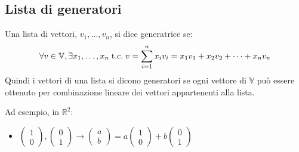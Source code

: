 \documentclass[a4paper,12pt]{article}
\begin{document}
	\subsection{Lista di generatori}
	Una lista di vettori, $v_1, \dots, v_n$, si dice generatrice se:
	\[\forall v \in \mathbb{V}, \exists x_1, \dots, x_n \;\text{t.c.}\; v = \sum_{i = 1}^{n} x_i v_i = x_1 v_1 + x_2 v_2 + \dots + x_n v_n\]
	Quindi i vettori di una lista si dicono generatori se ogni vettore di $\mathbb{V}$ può essere ottenuto per combinazione lineare dei vettori appartenenti alla lista.
	
	Ad esempio, in $\mathbb{R}^2$:
	\begin{itemize}
		\item $
			\begin{pmatrix}
				1 \\
				0
			\end{pmatrix}, \begin{pmatrix}
			0 \\
			1
			\end{pmatrix} 
			\rightarrow
			\begin{pmatrix}
				a \\
				b
			\end{pmatrix} = 
			a
			\begin{pmatrix}
			1 \\
			0
			\end{pmatrix} + 
			b
			\begin{pmatrix}
			0 \\
			1
			\end{pmatrix} 
			$
			

\end{itemize}
\end{document}
